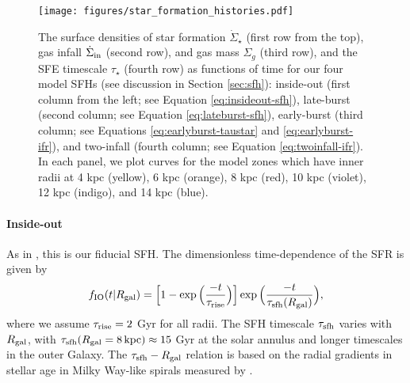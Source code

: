 \documentclass[twocolumn,twocolappendix,linenumbers]{aastex631}
\begin{document}
\begin{figure*}
    \centering
    \texttt{[image: figures/star\_formation\_histories.pdf]}
    \caption{The surface densities of star formation $\dot \Sigma_\star$ (first row from the top), gas infall $\dot \Sigma_{\rm in}$ (second row), and gas mass $\Sigma_g$ (third row), and the SFE timescale $\tau_\star$ (fourth row) as functions of time for our four model SFHs (see discussion in Section \ref{sec:sfh}): inside-out (first column from the left; see Equation \ref{eq:insideout-sfh}), late-burst (second column; see Equation \ref{eq:lateburst-sfh}), early-burst (third column; see Equations \ref{eq:earlyburst-taustar} and \ref{eq:earlyburst-ifr}), and two-infall (fourth column; see Equation \ref{eq:twoinfall-ifr}). In each panel, we plot curves for the model zones which have inner radii at 4 kpc (yellow), 6 kpc (orange), 8 kpc (red), 10 kpc (violet), 12 kpc (indigo), and 14 kpc (blue).}
    \label{fig:sfhs}
\end{figure*}

\paragraph{Inside-out} As in , this is our fiducial SFH. The dimensionless time-dependence of the SFR is given by
\begin{equation}
    f_{\rm IO}(t|R_{\rm gal}) = \Big[1 - \exp\Big(\frac{-t}{\tau_{\rm rise}}\Big)\Big] \exp\Big(\frac{-t}{\tau_{\rm sfh}(R_{\rm gal})}\Big),
    \label{eq:insideout-sfh}
\end{equation}
where we assume $\tau_{\rm rise}=2$ Gyr for all radii. The SFH timescale $\tau_{\rm sfh}$ varies with $R_{\rm gal}$, with $\tau_{\rm sfh}(R_{\rm gal}=8\,\rm{kpc})\approx15$ Gyr at the solar annulus and longer timescales in the outer Galaxy. The $\tau_{\rm sfh} - R_{\rm gal}$ relation is based on the radial gradients in stellar age in Milky Way-like spirals measured by \citet[][see Section 2.5 of  for details]{Sanchez2020-StarFormationTimescales}.
\end{document}

